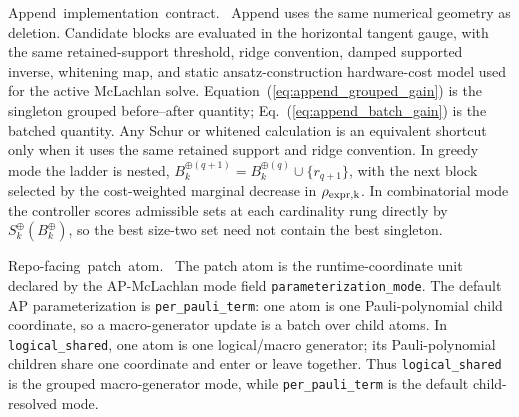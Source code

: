 \documentclass[
  reprint,
  amsmath,
  amssymb,
  aps,
  pra,
  nofootinbib,
  superscriptaddress,
  floatfix
]{revtex4-2}
\newcommand{\tentative}[1]{\textcolor{red!70!black}{#1}}
\newcommand{\structlabel}[1]{\noindent\mbox{\tentative{#1.}}~}
\begin{document}
\structlabel{Append implementation contract}
Append uses the same numerical geometry as deletion.  Candidate blocks are evaluated in the horizontal tangent gauge, with the same retained-support threshold, ridge convention, damped supported inverse, whitening map, and static ansatz-construction hardware-cost model used for the active McLachlan solve.  Equation~(\ref{eq:append_grouped_gain}) is the singleton grouped before--after quantity; Eq.~(\ref{eq:append_batch_gain}) is the batched quantity.  Any Schur or whitened calculation is an equivalent shortcut only when it uses the same retained support and ridge convention.  In greedy mode the ladder is nested, $B_k^{\oplus(q+1)}=B_k^{\oplus(q)}\cup\{r_{q+1}\}$, with the next block selected by the cost-weighted marginal decrease in $\rho_{\rm expr,k}$.  In combinatorial mode the controller scores admissible sets at each cardinality rung directly by \(S_k^{\oplus}(B_k^{\oplus})\), so the best size-two set need not contain the best singleton.

\structlabel{Repo-facing patch atom}
The patch atom is the runtime-coordinate unit declared by the AP-McLachlan mode field \texttt{parameterization\_mode}.  The default AP parameterization is \texttt{per\_pauli\_term}: one atom is one Pauli-polynomial child coordinate, so a macro-generator update is a batch over child atoms.  In \texttt{logical\_shared}, one atom is one logical/macro generator; its Pauli-polynomial children share one coordinate and enter or leave together.  Thus \texttt{logical\_shared} is the grouped macro-generator mode, while \texttt{per\_pauli\_term} is the default child-resolved mode.
\end{document}
